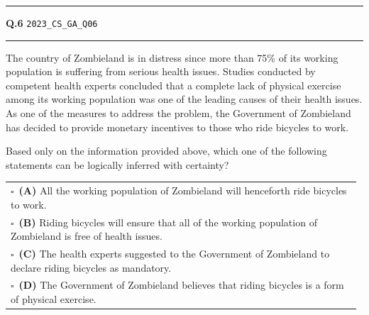 \documentclass[a4paper,10pt]{article}
\begin{document}
\vspace{6pt}\hrule height 0.35pt\vspace{6pt}
\noindent
\begin{tcolorbox}[
    blanker,
    sidebyside,
    sidebyside align=top,
    lefthand width=0.55\textwidth,
    top=4pt, bottom=4pt, left=0pt, right=0pt,
    middle=16pt,
    underlay={
        \draw[dashed, black!80, line width=0.8pt, dash pattern=on 4pt off 3pt]
            ([xshift=0.55\textwidth+8pt]frame.north west) --
            ([xshift=0.55\textwidth+8pt]frame.south west);
    }
]
\textbf{Q.6}  \hfill {\tiny\texttt{2023\_CS\_GA\_Q06}}
\vspace{2pt}\hrule height 0.3pt\vspace{4pt}

The country of Zombieland is in distress since more than 75\% of its working population is suffering from serious health issues. Studies conducted by competent health experts concluded that a complete lack of physical exercise among its working population was one of the leading causes of their health issues. As one of the measures to address the problem, the Government of Zombieland has decided to provide monetary incentives to those who ride bicycles to work.
\par\medskip
Based only on the information provided above, which one of the following statements can be logically inferred with certainty?

\par\vspace{6pt}\noindent
\begin{tabular}{@{}p{0.98\linewidth}@{}}
$\square$\ \textbf{(A)} All the working population of Zombieland will henceforth ride bicycles to work. \\
\addlinespace[3pt]
$\square$\ \textbf{(B)} Riding bicycles will ensure that all of the working population of Zombieland is free of health issues. \\
\addlinespace[3pt]
$\square$\ \textbf{(C)} The health experts suggested to the Government of Zombieland to declare riding bicycles as mandatory. \\
\addlinespace[3pt]
$\square$\ \textbf{(D)} The Government of Zombieland believes that riding bicycles is a form of physical exercise.
\end{tabular}

\tcblower


\end{tcolorbox}
\end{document}

